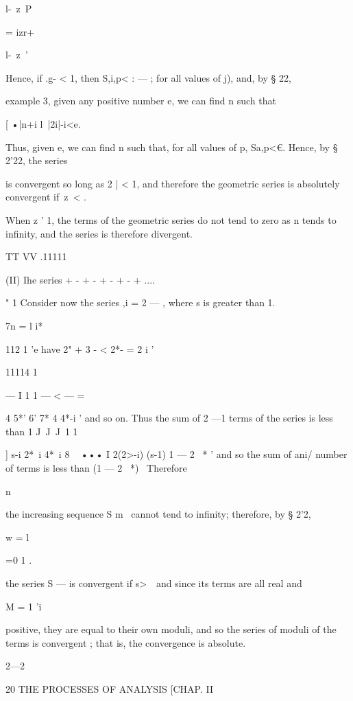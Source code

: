 l-\ z\ P



= izr+



l-\ z\ '



Hence, if .g- < 1, then S,i,p< : — ; for all values of j), and, by §
22,

example 3, given any positive number e, we can find n such that

[ •|n+i l\ |2i|-i<e.

Thus, given e, we can find n such that, for all values of p, Sa,p<€.
Hence, by § 2'22, the series

is convergent so long as 2 | < 1, and therefore the geometric series
is absolutely convergent if\ z\ < .

When z ' 1, the terms of the geometric series do not tend to zero as n
tends to infinity, and the series is therefore divergent.

TT VV .11111

(II) Ihe series + - + - + - + - + ....

" 1 Consider now the series ,i = 2 — , where s is greater than 1.

7n = l i*

112 1 'e have 2" + 3 - < 2*- = 2 i '

11114 1

— I 1 1 — < — =

4 5*' 6' 7* 4 4*-i ' and so on. Thus the sum of 2 —1 terms of the
series is less than 1 J\ J\ J\ 1 1



] s-i 2*~i 4*~i 8 ~ ••• I 2(2>-i) (s-1) 1 — 2 ~* ' and so the sum of
ani/ number of terms is less than (1 — 2 ~*)~ Therefore

n

the increasing sequence S m~ cannot tend to infinity; therefore, by §
2'2,

w = l

=0 1 .

the series S — is convergent if s>\ \ and since its terms are all real
and

M = 1 'i

positive, they are equal to their own moduli, and so the series of
moduli of the terms is convergent ; that is, the convergence is
absolute.

2—2



20 THE PROCESSES OF ANALYSIS [CHAP. II

